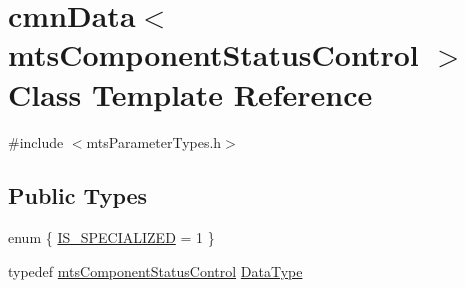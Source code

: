 \hypertarget{classcmn_data_3_01mts_component_status_control_01_4}{\section{cmn\-Data$<$ mts\-Component\-Status\-Control $>$ Class Template Reference}
\label{classcmn_data_3_01mts_component_status_control_01_4}
}


{\ttfamily \#include $<$mts\-Parameter\-Types.\-h$>$}

\subsection*{Public Types}
\begin{DoxyCompactItemize}
\item 
enum \{ \hyperlink{classcmn_data_3_01mts_component_status_control_01_4_a6901f36e79e2abe29fe997227e622e42a4bf4eb2c447583de4deb8e2e2da7ab6c}{I\-S\-\_\-\-S\-P\-E\-C\-I\-A\-L\-I\-Z\-E\-D} = 1
 \}
\item 
typedef \hyperlink{classmts_component_status_control}{mts\-Component\-Status\-Control} \hyperlink{classcmn_data_3_01mts_component_status_control_01_4_a568a9683fdee2127ddf90cb856733c3c}{Data\-Type}
\end{DoxyCompactItemize}
